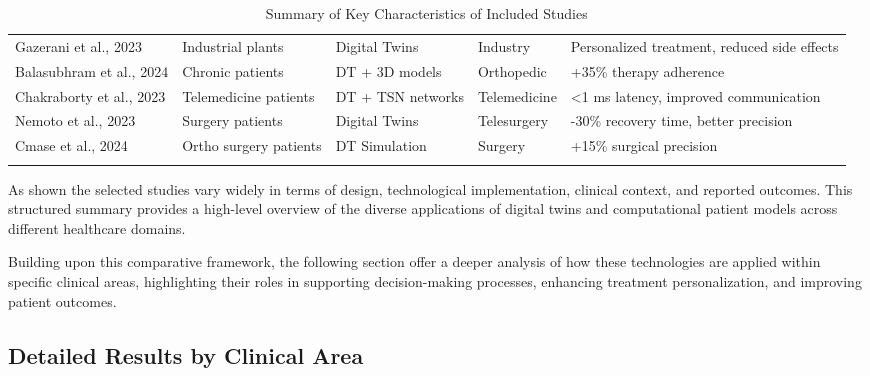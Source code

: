 \documentclass[10pt,a4paper]{article}
\begin{document}
\begin{small}
\begin{longtable}{|p{3.5cm}|p{2.8cm}|p{2.8cm}|p{2cm}|p{3.2cm}|}
Gazerani et al., 2023 & Industrial plants & Digital Twins & Industry & Personalized treatment, reduced side effects \\
Balasubhram et al., 2024 & Chronic patients & DT + 3D models & Orthopedic & +35\% therapy adherence \\
Chakraborty et al., 2023 & Telemedicine patients & DT + TSN networks & Telemedicine & <1 ms latency, improved communication \\
Nemoto et al., 2023 & Surgery patients & Digital Twins & Telesurgery & -30\% recovery time, better precision \\
Cmase et al., 2024 & Ortho surgery patients & DT Simulation & Surgery & +15\% surgical precision \\
\hline
\caption{Summary of Key Characteristics of Included Studies}
\label{tabella1}
\end{longtable}
\end{small}


As shown the selected studies vary widely in terms of design, technological implementation, clinical context, and reported outcomes. This structured summary provides a high-level overview of the diverse applications of digital twins and computational patient models across different healthcare domains.

Building upon this comparative framework, the following section offer a deeper analysis of how these technologies are applied within specific clinical areas, highlighting their roles in supporting decision-making processes, enhancing treatment personalization, and improving patient outcomes.

\subsection*{Detailed Results by Clinical Area}
\end{document}
